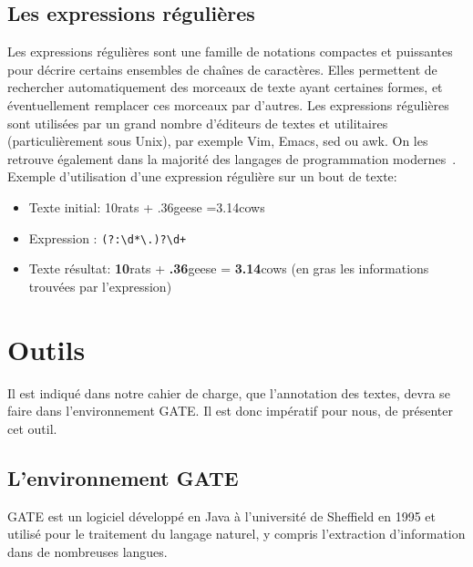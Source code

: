 \documentclass[a4paper, 11pt]{report}
\begin{document}
\subsection{Les expressions régulières}
Les expressions régulières sont une famille de notations compactes et puissantes pour décrire certains ensembles de chaînes de caractères. Elles permettent de rechercher automatiquement des morceaux de texte ayant certaines formes, et éventuellement remplacer ces morceaux par d'autres.
Les expressions régulières sont utilisées par un grand nombre d'éditeurs de textes et utilitaires (particulièrement sous Unix), par exemple Vim, Emacs, sed ou awk. On les retrouve également dans la majorité des langages de programmation modernes~\cite{w3}.\\
Exemple d'utilisation d'une expression régulière sur un bout de texte:
\begin{itemize}
\item Texte initial: 10rats + .36geese =3.14cows
\item Expression : \verb|(?:\d*\.)?\d+|
\item Texte résultat: \textbf{10}rats + \textbf{.36}geese = \textbf{3.14}cows (en gras les informations trouvées par l’expression)
\end{itemize}
\section{Outils}%
Il est indiqué dans notre cahier de charge, que l'annotation des textes, devra se faire dans l'environnement GATE. Il est donc impératif pour nous, de présenter cet outil.
\subsection{L'environnement GATE}
GATE est un logiciel développé en Java à l’université de Sheffield en 1995 et utilisé pour
le traitement du langage naturel, y compris l’extraction d’information dans de nombreuses
langues. 
\end{document}
